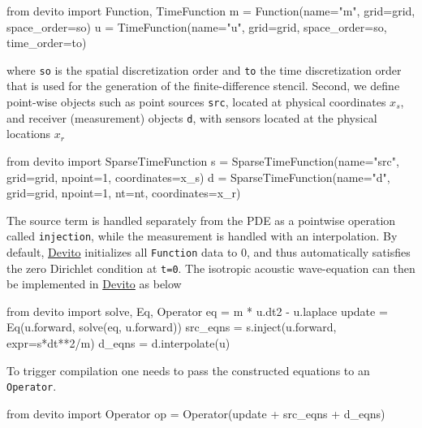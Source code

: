 \documentclass[conference]{IEEEtran}
\begin{document}
\begin{python}
from devito import Function, TimeFunction
m = Function(name="m", grid=grid,
             space_order=so)
u = TimeFunction(name="u", grid=grid,
                 space_order=so,
                 time_order=to)
\end{python}

where \texttt{so} is the spatial discretization order and \texttt{to}
the time discretization order that is used for the generation of the
finite-difference stencil. Second, we define point-wise objects such as
point sources \texttt{src}, located at physical coordinates $x_s$, and
receiver (measurement) objects \texttt{d}, with sensors located at the
physical locations $x_r$

\begin{python}
from devito import SparseTimeFunction
s = SparseTimeFunction(name="src",
                       grid=grid, npoint=1,
                       coordinates=x_s)
d = SparseTimeFunction(name="d", grid=grid,
                       npoint=1, nt=nt,
                       coordinates=x_r)
\end{python}

The source term is handled separately from the PDE as a pointwise
operation called \texttt{injection}, while the measurement is handled
with an interpolation. By default,
\href{https://github.com/devitocodes/devito}{Devito} initializes all
\texttt{Function} data to 0, and thus automatically satisfies the zero
Dirichlet condition at \texttt{t=0}. The isotropic acoustic
wave-equation can then be implemented in
\href{https://github.com/devitocodes/devito}{Devito} as below

\begin{python}
from devito import solve, Eq, Operator
eq = m * u.dt2 - u.laplace
update = Eq(u.forward, solve(eq, u.forward))
src_eqns = s.inject(u.forward, expr=s*dt**2/m)
d_eqns = d.interpolate(u)
\end{python}

To trigger compilation one needs to pass the constructed equations to an
\texttt{Operator}.

\begin{python}
from devito import Operator
op = Operator(update + src_eqns + d_eqns)
\end{python}
\end{document}
